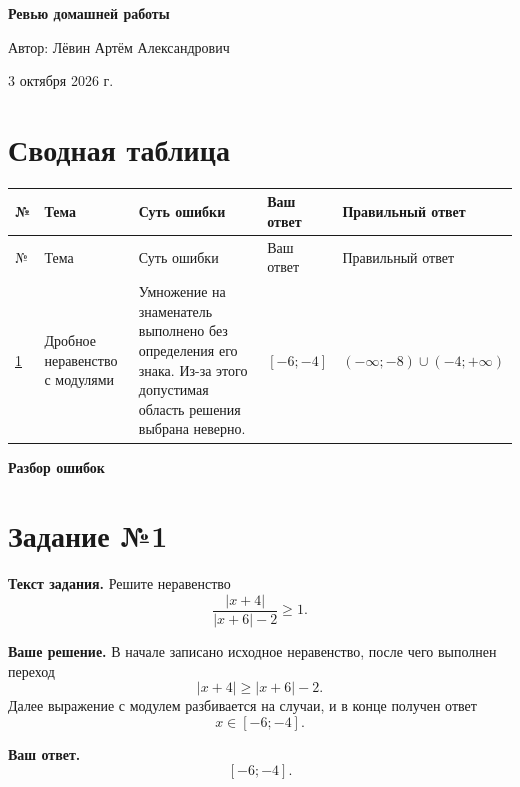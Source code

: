 \documentclass[12pt,a4paper]{article}
\newcommand{\tasktitle}[1]{\phantomsection\label{task:#1}\section*{Задание №#1}}
\begin{document}
\hypersetup{pageanchor=false}
\begin{titlepage}
\centering
\vspace*{0.22\textheight}
{\LARGE\bfseries Ревью домашней работы\par}
\vspace{1.6cm}
{\large Автор: Лёвин Артём Александрович\par}
\vspace{0.5cm}
{\large 3 октября 2026 г.\par}
\vfill
{}
\end{titlepage}
\hypersetup{pageanchor=true}

\newpage
\section*{Сводная таблица}
\small
\begin{longtable}{>{\centering\arraybackslash}p{0.8cm} p{3.1cm} p{5.2cm} p{2.5cm} p{2.8cm}}
\toprule
№ & Тема & Суть ошибки & Ваш ответ & Правильный ответ \\
\midrule
\endfirsthead
\toprule
№ & Тема & Суть ошибки & Ваш ответ & Правильный ответ \\
\midrule
\endhead
\hyperref[task:1]{1} & Дробное неравенство с модулями & Умножение на знаменатель выполнено без определения его знака. Из-за этого допустимая область решения выбрана неверно. & $[-6;-4]$ & $(-\infty;-8)\cup(-4;+\infty)$ \\
\bottomrule
\end{longtable}
\normalsize

\newpage
\vspace*{0.32\textheight}
\begin{center}
{\LARGE\bfseries Разбор ошибок}
\end{center}
\vfill
\newpage

\tasktitle{1}

\textbf{Текст задания.}
Решите неравенство
\[
\frac{|x+4|}{|x+6|-2}\ge 1.
\]

\textbf{Ваше решение.}
В начале записано исходное неравенство, после чего выполнен переход
\[
|x+4|\ge |x+6|-2.
\]
Далее выражение с модулем разбивается на случаи, и в конце получен ответ
\[
x\in[-6;-4].
\]

\textbf{Ваш ответ.}
\[
[-6;-4].
\]
\end{document}
